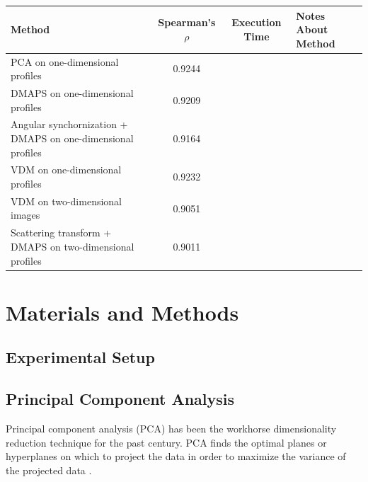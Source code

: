 \documentclass[10pt]{article}
\begin{document}
\begin{table}
	\begin{tabular}{| p{} | c | c | p{} |}
		\hline 
		Method & Spearman's $\rho$ & Execution Time & Notes About Method \\ 
		\hline 
		PCA on one-dimensional profiles & 0.9244 & & \\
		\hline 
		DMAPS on one-dimensional profiles & 0.9209 & & \\
		\hline 
		Angular synchornization + DMAPS on one-dimensional profiles & 0.9164 & & \\
		\hline 
		VDM on one-dimensional profiles & 0.9232 & & \\	
		\hline 
		VDM on two-dimensional images & 0.9051  & & \\
		\hline 	
		Scattering transform + DMAPS on two-dimensional profiles & 0.9011  & & \\
		\hline
	\end{tabular}
\end{table}
\section*{Materials and Methods}

\subsection*{Experimental Setup}

\subsection*{Principal Component Analysis}
Principal component analysis (PCA) has been the workhorse dimensionality reduction technique for the past century.
%
PCA finds the optimal planes or hyperplanes on which to project the data in order to maximize the variance of the projected data \cite{shlens2005tutorial}.
\end{document}

